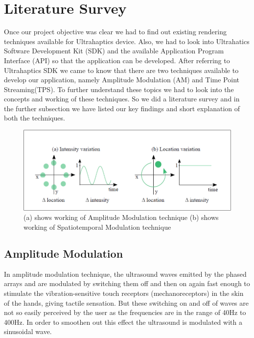 %
\chapter{Literature Survey}
\label{sec:related}

Once our project objective was clear we had to find out existing rendering techniques available for Ultrahaptics device. Also, we had to look into Ultrahatics Software Development Kit (SDK) and the available Application Program Interface (API) so that the application can be developed. After referring to Ultrahaptics SDK we came to know that there are two techniques available to develop our application, namely Amplitude Modulation (AM) and Time Point Streaming(TPS). To further understand these topics we had to look into the concepts and working of these techniques. So we did a literature survey and in the further subsection we have listed our key findings and short explanation of both the techniques.

\begin{figure}[htb]
	\includegraphics[width=\textwidth]{gfx/am_tps.png}
	\caption{(a) shows working of Amplitude Modulation technique (b) shows working of Spatiotemporal Modulation technique \cite{Frier2018}}
	\label{fig:related:am_tps}
\end{figure}

\section{Amplitude Modulation}
\label{sec:related:sec1}

In amplitude modulation technique, the ultrasound waves emitted by the phased arrays and are modulated by switching them off and then on again fast enough to stimulate the vibration-sensitive touch receptors (mechanoreceptors) in the skin of the hands, giving tactile sensation. But these switching on and off of waves are not so easily perceived by the user as the frequencies are in the range of 40Hz to 400Hz. In order to smoothen out this effect the ultrasound is modulated with a sinusoidal wave.\cite{am}

